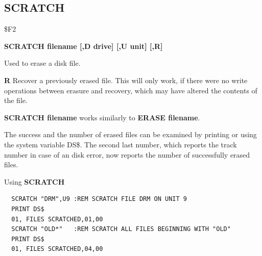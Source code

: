 \subsection{SCRATCH}
\begin{description}[leftmargin=2cm,style=nextline]
\item [Token:] \$F2
\item [Format:] {\bf SCRATCH filename [,D drive] [,U unit] [,R]}
\item [Usage:] Used to erase a disk file.

   \filenamedefinition

   \drivedefinition

   \unitdefinition

   {\bf R} Recover a previously erased file.
   This will only work, if there were no write operations
   between erasure and recovery, which may have altered the
   contents of the file.

\item [Remarks:] {\bf SCRATCH filename} works similarly to
                 {\bf ERASE filename}.

                 The success and the number of erased files can
                 be examined by printing or using the system
                 variable DS\$. The second last number, which
                 reports the track number in case of an disk error,
                 now reports the number of successfully erased files.

\item [Example:] Using {\bf SCRATCH}
\begin{tcolorbox}[colback=black,coltext=white]
\verbatimfont{\codefont}
\begin{verbatim}
  SCRATCH "DRM",U9 :REM SCRATCH FILE DRM ON UNIT 9
  PRINT DS$
  01, FILES SCRATCHED,01,00
  SCRATCH "OLD*"   :REM SCRATCH ALL FILES BEGINNING WITH "OLD"
  PRINT DS$
  01, FILES SCRATCHED,04,00
\end{verbatim}
\end{tcolorbox}
\end{description}


\newpage
